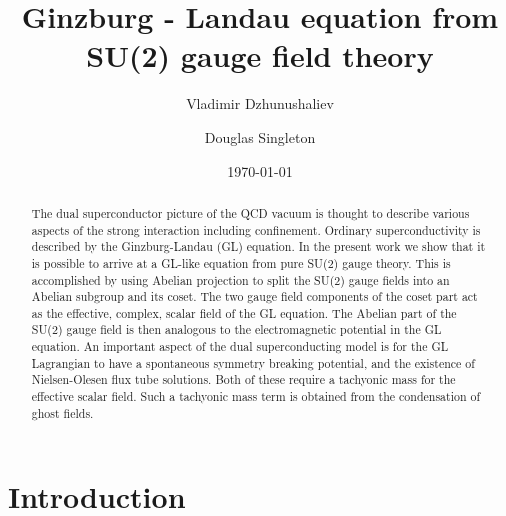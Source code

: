 \documentclass[a4paper,aps,showpacs]{revtex4}
\begin{document}
\title{Ginzburg - Landau equation from SU(2) gauge field theory}
\author{Vladimir Dzhunushaliev}

\author{Douglas Singleton}

\date{\today}

\begin{abstract}

The dual superconductor picture of the QCD vacuum is thought to describe
various aspects of the strong interaction including confinement. Ordinary
superconductivity is described by the Ginzburg-Landau (GL) equation. In the present 
work we  show that it is possible to arrive at a GL-like equation
from pure SU(2) gauge theory. This is accomplished by using Abelian projection 
to split the SU(2) gauge fields into an Abelian subgroup and its coset. The 
two gauge field components of the coset part act as the effective, complex, scalar 
field of the GL equation. The Abelian part of the SU(2) gauge field 
is then analogous to the electromagnetic potential in the GL equation.
An important aspect of the dual superconducting model is for the GL 
Lagrangian to have a spontaneous symmetry breaking potential, and the existence
of Nielsen-Olesen flux tube solutions. Both of these
require a tachyonic mass for the effective scalar field. Such a
tachyonic mass term is obtained from the condensation of ghost fields.
\end{abstract}


\maketitle

\section{Introduction}
\end{document}
